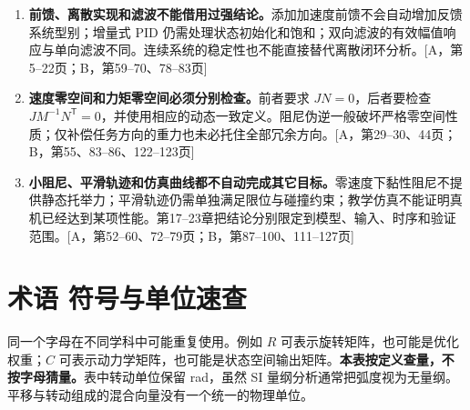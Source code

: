 \begin{enumerate}
\item \textbf{前馈、离散实现和滤波不能借用过强结论。}添加加速度前馈不会自动增加反馈系统型别；增量式 PID 仍需处理状态初始化和饱和；双向滤波的有效幅值响应与单向滤波不同。连续系统的稳定性也不能直接替代离散闭环分析。[A，第5--22页；B，第59--70、78--83页]

\item \textbf{速度零空间和力矩零空间必须分别检查。}前者要求 $JN=0$，后者要检查 $JM^{-1}N^{\mathsf T}=0$，并使用相应的动态一致定义。阻尼伪逆一般破坏严格零空间性质；仅补偿任务方向的重力也未必托住全部冗余方向。[A，第29--30、44页；B，第55、83--86、122--123页]

\item \textbf{小阻尼、平滑轨迹和仿真曲线都不自动完成其它目标。}零速度下黏性阻尼不提供静态托举力；平滑轨迹仍需单独满足限位与碰撞约束；教学仿真不能证明真机已经达到某项性能。第17--23章把结论分别限定到模型、输入、时序和验证范围。[A，第52--60、72--79页；B，第87--100、111--127页]
\end{enumerate}

\chapter{术语 符号与单位速查}\label{app:glossary}

同一个字母在不同学科中可能重复使用。例如 $R$ 可表示旋转矩阵，也可能是优化权重；$C$ 可表示动力学矩阵，也可能是状态空间输出矩阵。\textbf{本表按定义查量，不按字母猜量。}表中转动单位保留 rad，虽然 SI 量纲分析通常把弧度视为无量纲。平移与转动组成的混合向量没有一个统一的物理单位。

